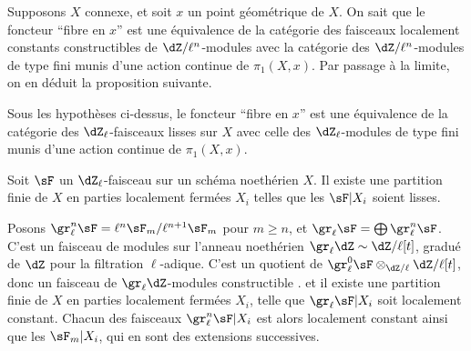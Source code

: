Supposons $X$ connexe, et soit $x$ un point géométrique de $X$. On sait que 
le foncteur ``fibre en $x$'' est une équivalence de la catégorie des 
faisceaux localement constants constructibles de $\dZ/\ell^n$-modules avec la 
catégorie des $\dZ/\ell^n$-modules de type fini munis d'une action continue 
de $\pi_1(X,x)$. Par passage à la limite, on en déduit la proposition 
suivante. 





\begin{proposition_}\label{II:2-4}
Sous les hypothèses ci-dessus, le foncteur ``fibre en $x$'' est une 
équivalence de la catégorie des $\dZ_\ell$-faisceaux lisses sur $X$ avec 
celle des $\dZ_\ell$-modules de type fini munis d'une action continue de 
$\pi_1(X,x)$. 
\end{proposition_}





\begin{proposition_}\label{II:2-5}
Soit $\sF$ un $\dZ_\ell$-faisceau sur un schéma noethérien $X$. Il existe 
une partition finie de $X$ en parties localement fermées $X_i$ telles que 
les $\sF|X_i$ soient lisses.
\end{proposition_}

Posons $\gr_\ell^n\sF=\ell^n\sF_m/\ell^{n+1}\sF_m$ pour $m\geqslant n$, et 
$\gr_\ell\sF=\bigoplus \gr_\ell^n\sF$. C'est un faisceau de modules sur 
l'anneau noethérien $\gr_\ell\dZ\sim\dZ/\ell[t]$, gradué de $\dZ$ pour la 
filtration $\ell$-adique. C'est un quotient de 
$\gr_\ell^0\sF \otimes_{\dZ/\ell} \dZ/\ell[t]$, donc un faisceau de 
$\gr_\ell\dZ$-modules constructible . et il existe une partition 
finie de $X$ en parties localement fermées $X_i$, telle que 
$\gr_\ell \sF|X_i$ soit localement constant. Chacun des faisceaux 
$\gr_\ell^n\sF|X_i$ est alors localement constant ainsi que les $\sF_m|X_i$, 
qui en sont des extensions successives. 





\subsection{}\label{II:2-6}

